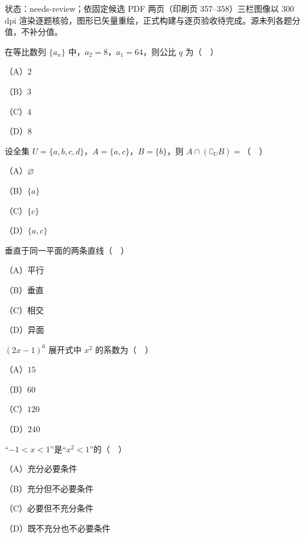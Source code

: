 

状态：needs-review；依固定候选 PDF 两页（印刷页 357–358）三栏图像以 300 dpi 渲染逐题核验，图形已矢量重绘，正式构建与逐页验收待完成。源未列各题分值，不补分值。


\begin{question}
在等比数列 $\{a_n\}$ 中，$a_2=8$，$a_1=64$，则公比 $q$ 为（　）

（A）$2$

（B）$3$

（C）$4$

（D）$8$

\end{question}
\begin{question}
设全集 $U=\{a,b,c,d\}$，$A=\{a,c\}$，$B=\{b\}$，则 $A\cap(\complement_UB)=$（　）

（A）$\varnothing$

（B）$\{a\}$

（C）$\{c\}$

（D）$\{a,c\}$

\end{question}
\begin{question}
垂直于同一平面的两条直线（　）

（A）平行

（B）垂直

（C）相交

（D）异面

\end{question}
\begin{question}
$(2x-1)^6$ 展开式中 $x^2$ 的系数为（　）

（A）$15$

（B）$60$

（C）$120$

（D）$240$

\end{question}
\begin{question}
“$-1<x<1$”是“$x^2<1$”的（　）

（A）充分必要条件

（B）充分但不必要条件

（C）必要但不充分条件

（D）既不充分也不必要条件

\end{question}
